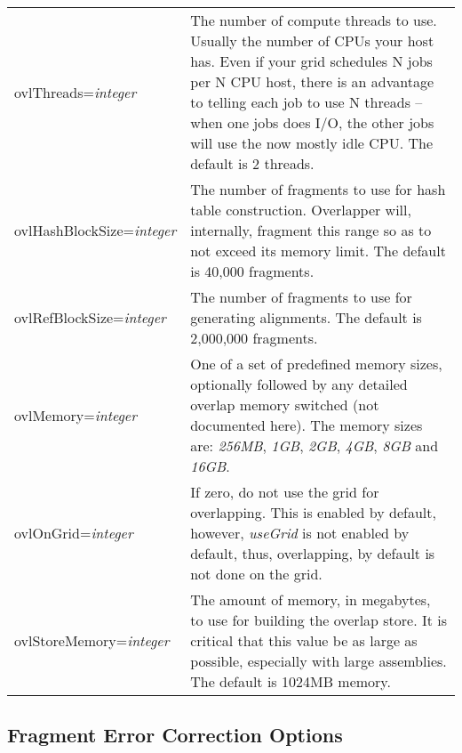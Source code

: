 \documentclass[twoside,11pt]{article}
\begin{document}
\begin{longtable}{lp{3.0in}}
ovlThreads={\it integer} &
The number of compute threads to use.  Usually the number of CPUs your
host has.  Even if your grid schedules N jobs per N CPU host, there is
an advantage to telling each job to use N threads -- when one jobs
does I/O, the other jobs will use the now mostly idle CPU.  The default is 2 threads.
\\

ovlHashBlockSize={\it integer} &
The number of fragments to use for hash table construction.
Overlapper will, internally, fragment this range so as to not exceed
its memory limit.  The default is 40,000 fragments.
\\

ovlRefBlockSize={\it integer} &
The number of fragments to use for generating alignments.  The default
is 2,000,000 fragments.
\\

ovlMemory={\it integer} &
One of a set of predefined memory sizes, optionally followed by any
detailed overlap memory switched (not documented here).  The memory sizes are:
{\it 256MB},
{\it 1GB},
{\it 2GB},
{\it 4GB},
{\it 8GB} and
{\it 16GB}.
\\

ovlOnGrid={\it integer} &
If zero, do not use the grid for overlapping.  This is enabled by
default, however, {\em useGrid} is not enabled by default, thus,
overlapping, by default is not done on the grid.
\\

ovlStoreMemory={\it integer} &
The amount of memory, in megabytes, to use for building the overlap
store.  It is critical that this value be as large as possible,
especially with large assemblies.  The default is 1024MB memory.
\\
\end{longtable}



\subsection{Fragment Error Correction Options}
\end{document}
